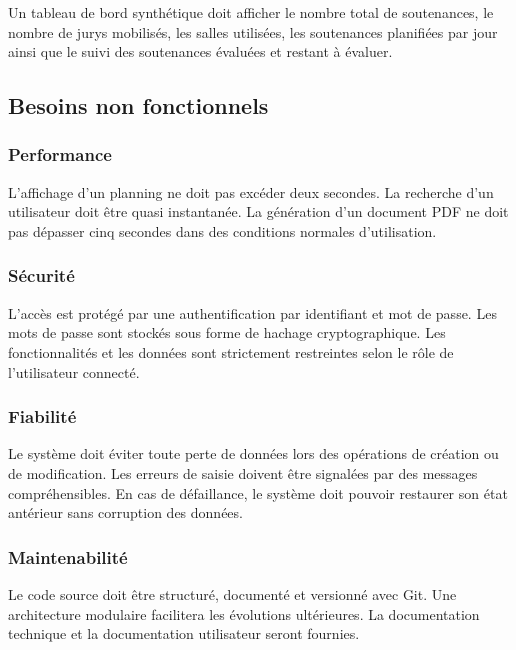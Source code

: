 \documentclass[12pt,a4paper]{article}
\begin{document}
Un tableau de bord synthétique doit afficher le nombre total de soutenances, le
nombre de jurys mobilisés, les salles utilisées, les soutenances planifiées par
jour ainsi que le suivi des soutenances évaluées et restant à évaluer.

\subsection{Besoins non fonctionnels}
\label{subsec:besoins_non_fonctionnels}

\subsubsection{Performance}
L'affichage d'un planning ne doit pas excéder deux secondes. La recherche d'un
utilisateur doit être quasi instantanée. La génération d'un document PDF ne doit
pas dépasser cinq secondes dans des conditions normales d'utilisation.

\subsubsection{Sécurité}
L'accès est protégé par une authentification par identifiant et mot de passe. Les
mots de passe sont stockés sous forme de hachage cryptographique. Les
fonctionnalités et les données sont strictement restreintes selon le rôle de
l'utilisateur connecté.

\subsubsection{Fiabilité}
Le système doit éviter toute perte de données lors des opérations de création ou
de modification. Les erreurs de saisie doivent être signalées par des messages
compréhensibles. En cas de défaillance, le système doit pouvoir restaurer son
état antérieur sans corruption des données.

\subsubsection{Maintenabilité}
Le code source doit être structuré, documenté et versionné avec Git. Une
architecture modulaire facilitera les évolutions ultérieures. La documentation
technique et la documentation utilisateur seront fournies.

\end{document}
